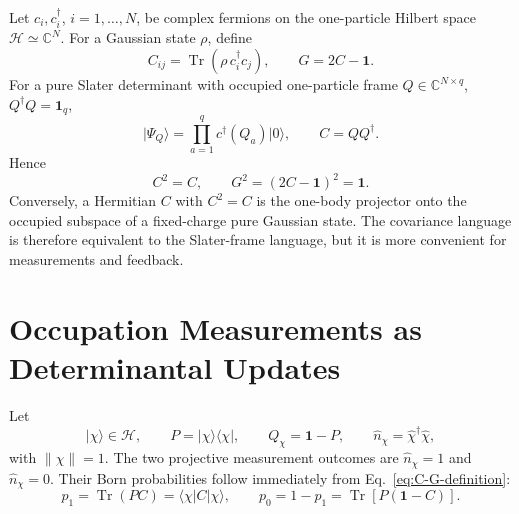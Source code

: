 \documentclass[aps,prb,onecolumn,nofootinbib,superscriptaddress]{revtex4-2}
\newcommand{\I}{\mathbf{1}}
\newcommand{\Tr}{\operatorname{Tr}}
\newcommand{\ket}[1]{\lvert #1\rangle}
\newcommand{\bra}[1]{\langle #1\rvert}
\newcommand{\cH}{\mathcal{H}}
\theoremstyle{plain}
\theoremstyle{definition}
\begin{document}
Let \(c_i,c_i^\dagger\), \(i=1,\ldots,N\), be complex fermions on the
one-particle Hilbert space \(\cH\simeq \mathbb C^N\).  For a Gaussian state
\(\rho\), define
\begin{equation}
  C_{ij}=\Tr(\rho\,c_i^\dagger c_j),
  \qquad
  G=2C-\I .
  \label{eq:C-G-definition}
\end{equation}
For a pure Slater determinant with occupied one-particle frame
\(Q\in\mathbb C^{N\times q}\), \(Q^\dagger Q=\I_q\),
\begin{equation}
  \ket{\Psi_Q}=
  \prod_{a=1}^{q} c^\dagger(Q_a)\ket{0},
  \qquad
  C=QQ^\dagger .
  \label{eq:slater-frame}
\end{equation}
Hence
\begin{equation}
  C^2=C,
  \qquad
  G^2=(2C-\I)^2=\I .
  \label{eq:pure-identities}
\end{equation}
Conversely, a Hermitian \(C\) with \(C^2=C\) is the one-body projector onto
the occupied subspace of a fixed-charge pure Gaussian state.  The covariance
language is therefore equivalent to the Slater-frame language, but it is more
convenient for measurements and feedback.

\section{Occupation Measurements as Determinantal Updates}
\label{sec:occupation-measurements}

Let
\begin{equation}
  \ket{\chi}\in\cH,
  \qquad
  P=\ket{\chi}\bra{\chi},
  \qquad
  Q_\chi=\I-P,
  \qquad
  \hat n_\chi=\hat\chi^\dagger\hat\chi ,
  \label{eq:rank-one-mode}
\end{equation}
with \(\|\chi\|=1\).  The two projective measurement outcomes are
\(\hat n_\chi=1\) and \(\hat n_\chi=0\).  Their Born probabilities follow
immediately from Eq.~\eqref{eq:C-G-definition}:
\begin{equation}
  p_1=\Tr(PC)=\bra{\chi}C\ket{\chi},
  \qquad
  p_0=1-p_1=\Tr[P(\I-C)] .
  \label{eq:single-mode-born}
\end{equation}
\end{document}
